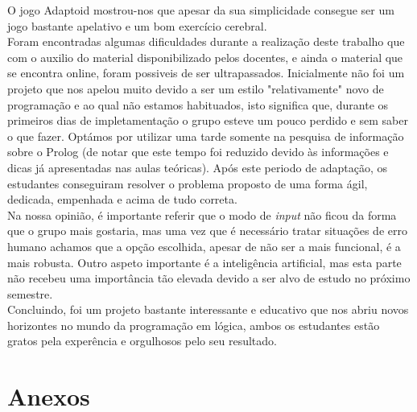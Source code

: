 \documentclass[a4paper]{article}
\begin{document}
O jogo Adaptoid mostrou-nos que apesar da sua simplicidade consegue ser um jogo bastante apelativo e um bom exercício cerebral.
\\

Foram encontradas algumas dificuldades durante a realização deste trabalho que com o auxilio do material disponibilizado pelos docentes, e ainda o material que se encontra online, foram possiveis de ser ultrapassados. Inicialmente não foi um projeto que nos apelou muito devido a ser um estilo "relativamente" novo de programação e ao qual não estamos habituados, isto significa que, durante os primeiros dias de impletamentação o grupo esteve um pouco perdido e sem saber o que fazer. Optámos por utilizar uma tarde somente na pesquisa de informação sobre o Prolog (de notar que este tempo foi reduzido devido às informações e dicas já apresentadas nas aulas teóricas). Após este periodo de adaptação, os estudantes conseguiram resolver o problema proposto de uma forma ágil, dedicada, empenhada e acima de tudo correta.
\\

Na nossa opinião, é importante referir que o modo de \textit{input} não ficou da forma que o grupo mais gostaria, mas uma vez que é necessário tratar situações de erro humano achamos que a opção escolhida, apesar de não ser a mais funcional, é a mais robusta. Outro aspeto importante é a inteligência artificial, mas esta parte não recebeu uma importância tão elevada devido a ser alvo de estudo no próximo semestre.
\\

Concluindo, foi um projeto bastante interessante e educativo que nos abriu novos horizontes no mundo da programação em lógica, ambos os estudantes estão gratos pela experência e orgulhosos pelo seu resultado.

\clearpage

\nocite{*}
\renewcommand\refname{Bibliografia}

{}

\newpage
\appendix
\section{Anexos}
\end{document}
